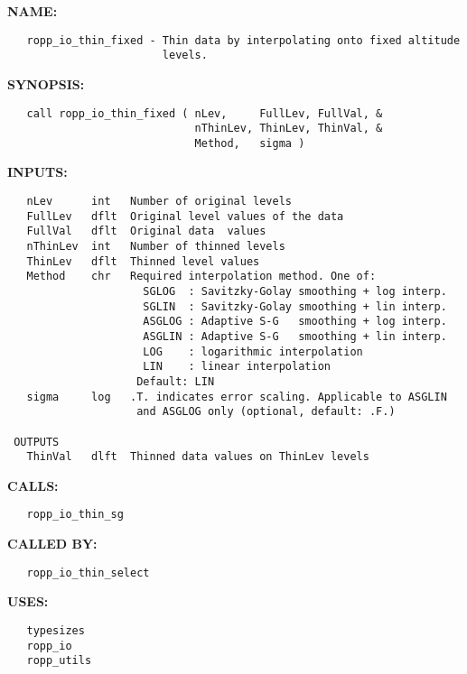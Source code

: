 \label{ch:robo108}
\label{ch:Thin_ropp_io_thin_fixed}
\textbf{NAME:}\hspace{0.08in}\begin{Verbatim}
   ropp_io_thin_fixed - Thin data by interpolating onto fixed altitude
                        levels.
\end{Verbatim}
\textbf{SYNOPSIS:}\hspace{0.08in}\begin{Verbatim}
   call ropp_io_thin_fixed ( nLev,     FullLev, FullVal, &
                             nThinLev, ThinLev, ThinVal, &
                             Method,   sigma )
\end{Verbatim}
\textbf{INPUTS:}\hspace{0.08in}\begin{Verbatim}
   nLev      int   Number of original levels
   FullLev   dflt  Original level values of the data
   FullVal   dflt  Original data  values
   nThinLev  int   Number of thinned levels
   ThinLev   dflt  Thinned level values
   Method    chr   Required interpolation method. One of:
                     SGLOG  : Savitzky-Golay smoothing + log interp.
                     SGLIN  : Savitzky-Golay smoothing + lin interp.
                     ASGLOG : Adaptive S-G   smoothing + log interp.
                     ASGLIN : Adaptive S-G   smoothing + lin interp.
                     LOG    : logarithmic interpolation
                     LIN    : linear interpolation
                    Default: LIN
   sigma     log   .T. indicates error scaling. Applicable to ASGLIN
                    and ASGLOG only (optional, default: .F.)

 OUTPUTS
   ThinVal   dlft  Thinned data values on ThinLev levels
\end{Verbatim}
\textbf{CALLS:}\hspace{0.08in}\begin{Verbatim}
   ropp_io_thin_sg
\end{Verbatim}
\textbf{CALLED BY:}\hspace{0.08in}\begin{Verbatim}
   ropp_io_thin_select
\end{Verbatim}
\textbf{USES:}\hspace{0.08in}\begin{Verbatim}
   typesizes
   ropp_io
   ropp_utils
\end{Verbatim}
